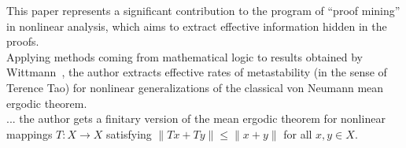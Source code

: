 This paper represents a significant contribution to the program of ``proof
mining'' in nonlinear analysis, which aims to extract effective information
hidden in the proofs.\\
Applying methods coming from mathematical logic to results obtained by
Wittmann~\cite{Wittmann90}, the author extracts effective rates of metastability (in the sense
of Terence Tao) for nonlinear generalizations of the classical von Neumann
mean ergodic theorem.\\
... the author
gets a finitary version of the mean ergodic theorem for nonlinear mappings
$T : X \to X$ satisfying $\|T x + T y\| \leq \|x + y\|$ for all $x, y \in X$.